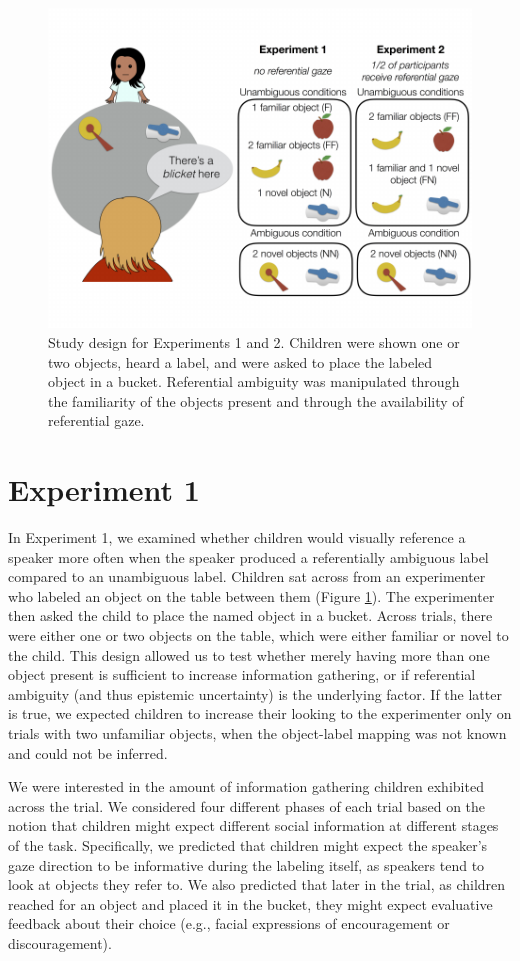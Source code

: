 \documentclass[english,man]{apa6}
\theoremstyle{definition}
\theoremstyle{definition}
\theoremstyle{definition}
\theoremstyle{remark}
\begin{document}
\begin{figure}
\centering
\includegraphics{figs/design-1.pdf}
\caption{\label{fig:design}Study design for Experiments 1 and 2. Children
were shown one or two objects, heard a label, and were asked to place
the labeled object in a bucket. Referential ambiguity was manipulated
through the familiarity of the objects present and through the
availability of referential gaze.}
\end{figure}

\section{Experiment 1}\label{experiment-1}

In Experiment 1, we examined whether children would visually reference a
speaker more often when the speaker produced a referentially ambiguous
label compared to an unambiguous label. Children sat across from an
experimenter who labeled an object on the table between them (Figure
\ref{fig:design}). The experimenter then asked the child to place the
named object in a bucket. Across trials, there were either one or two
objects on the table, which were either familiar or novel to the child.
This design allowed us to test whether merely having more than one
object present is sufficient to increase information gathering, or if
referential ambiguity (and thus epistemic uncertainty) is the underlying
factor. If the latter is true, we expected children to increase their
looking to the experimenter only on trials with two unfamiliar objects,
when the object-label mapping was not known and could not be inferred.

We were interested in the amount of information gathering children
exhibited across the trial. We considered four different phases of each
trial based on the notion that children might expect different social
information at different stages of the task. Specifically, we predicted
that children might expect the speaker's gaze direction to be
informative during the labeling itself, as speakers tend to look at
objects they refer to. We also predicted that later in the trial, as
children reached for an object and placed it in the bucket, they might
expect evaluative feedback about their choice (e.g., facial expressions
of encouragement or discouragement).
\end{document}
